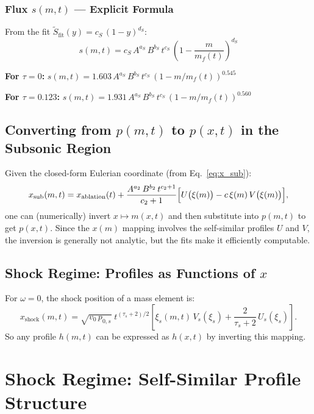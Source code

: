 \documentclass[11pt]{article}
\newcommand{\xsi}{\xi}
\begin{document}
\subsubsection{Flux $s(m,t)$ --- Explicit Formula}

From the fit $\tilde{S}_{\mathrm{fit}}(y) = c_S\,(1-y)^{d_S}$:
\begin{equation}
  \boxed{s(m,t) = c_S\,A^{a_S}\,B^{b_S}\,t^{c_S}\,\left(1-\frac{m}{m_f(t)}\right)^{d_S}}
\end{equation}

\textbf{For $\tau=0$:}
$s(m,t) = 1.603\,A^{a_S}\,B^{b_S}\,t^{c_S}\,\left(1-m/m_f(t)\right)^{0.545}$

\textbf{For $\tau=0.123$:}
$s(m,t) = 1.931\,A^{a_S}\,B^{b_S}\,t^{c_S}\,\left(1-m/m_f(t)\right)^{0.560}$


\subsection{Converting from $p(m,t)$ to $p(x,t)$ in the Subsonic Region}

Given the closed-form Eulerian coordinate (from Eq.~\eqref{eq:x_sub}):
\begin{equation}
  x_{\mathrm{sub}}(m,t) = x_{\mathrm{ablation}}(t) + \frac{A^{a_2}\,B^{b_2}\,t^{c_2+1}}{c_2+1}
  \Bigl[U\bigl(\xsi(m)\bigr) - c\,\xsi(m)\,V\bigl(\xsi(m)\bigr)\Bigr],
\end{equation}
one can (numerically) invert $x \mapsto m(x,t)$ and then substitute into $p(m,t)$ to get $p(x,t)$. Since the $x(m)$ mapping involves the self-similar profiles $U$ and $V$, the inversion is generally not analytic, but the fits make it efficiently computable.

\subsection{Shock Regime: Profiles as Functions of $x$}

For $\omega = 0$, the shock position of a mass element is:
\begin{equation}
  x_{\mathrm{shock}}(m,t) = \sqrt{v_0\,p_{0,s}}\;t^{(\tau_s+2)/2}
  \left[\xsi_s(m,t)\,V_s(\xsi_s) + \frac{2}{\tau_s+2}\,U_s(\xsi_s)\right].
\end{equation}
So any profile $h(m,t)$ can be expressed as $h(x,t)$ by inverting this mapping.

\section{Shock Regime: Self-Similar Profile Structure}
\label{sec:shock_profiles_structure}
\end{document}
